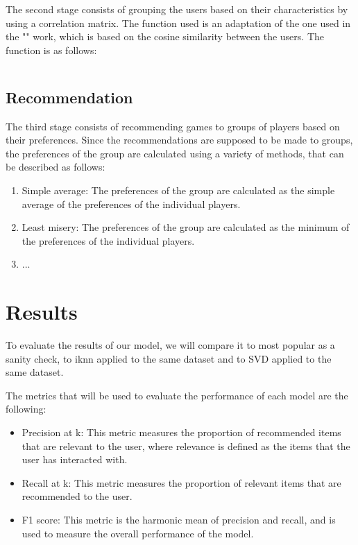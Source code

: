 \documentclass{article}
\begin{document}
The second stage consists of grouping the users based on their characteristics by using a correlation matrix. The function used is an adaptation of the one used in the "" work, which is based on the cosine similarity between the users. The function is as follows:

\begin{equation}
\end{equation}


\subsection{Recommendation}
The third stage consists of recommending games to groups of players based on their preferences. Since the recommendations are supposed to be made to groups, the preferences of the group are calculated using a variety of methods, that can be described as follows:
\begin{enumerate}
    \item Simple average: The preferences of the group are calculated as the simple average of the preferences of the individual players.
    \item Least misery: The preferences of the group are calculated as the minimum of the preferences of the individual players.
    \item ... %
\end{enumerate}

\section{Results}

To evaluate the results of our model, we will compare it to most popular as a sanity check, to iknn applied to the same dataset and to SVD applied to the same dataset. %

The metrics that will be used to evaluate the performance of each model are the following:

\begin{itemize}
    \item Precision at k: This metric measures the proportion of recommended items that are relevant to the user, where relevance is defined as the items that the user has interacted with.
    \item Recall at k: This metric measures the proportion of relevant items that are recommended to the user.
    \item F1 score: This metric is the harmonic mean of precision and recall, and is used to measure the overall performance of the model.
\end{itemize}
\end{document}
